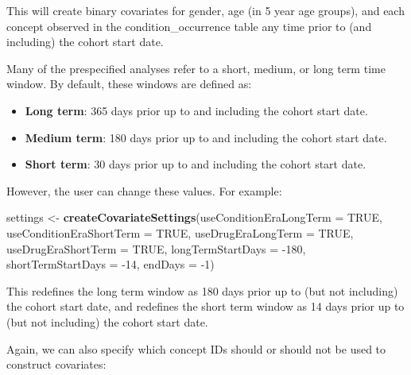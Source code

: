 \documentclass[11pt]{book}
\newenvironment{Shaded}{\begin{snugshade}}{\end{snugshade}}
\newcommand{\DataTypeTok}[1]{\textcolor[rgb]{0.13,0.29,0.53}{#1}}
\newcommand{\DecValTok}[1]{\textcolor[rgb]{0.00,0.00,0.81}{#1}}
\newcommand{\KeywordTok}[1]{\textcolor[rgb]{0.13,0.29,0.53}{\textbf{#1}}}
\newcommand{\NormalTok}[1]{#1}
\newcommand{\OtherTok}[1]{\textcolor[rgb]{0.56,0.35,0.01}{#1}}
\newcommand{\StringTok}[1]{\textcolor[rgb]{0.31,0.60,0.02}{#1}}
\providecommand{\tightlist}{%
  \setlength{\itemsep}{0pt}\setlength{\parskip}{0pt}}
\theoremstyle{definition}
\theoremstyle{definition}
\theoremstyle{definition}
\theoremstyle{remark}
\begin{document}
This will create binary covariates for gender, age (in 5 year age groups), and each concept observed in the condition\_occurrence table any time prior to (and including) the cohort start date.

Many of the prespecified analyses refer to a short, medium, or long term time window. By default, these windows are defined as:

\begin{itemize}
\tightlist
\item
  \textbf{Long term}: 365 days prior up to and including the cohort start date.
\item
  \textbf{Medium term}: 180 days prior up to and including the cohort start date.
\item
  \textbf{Short term}: 30 days prior up to and including the cohort start date.
\end{itemize}

However, the user can change these values. For example:

\begin{Shaded}
\begin{Highlighting}[]
\NormalTok{settings <-}\StringTok{ }\KeywordTok{createCovariateSettings}\NormalTok{(}\DataTypeTok{useConditionEraLongTerm =} \OtherTok{TRUE}\NormalTok{, }
                                    \DataTypeTok{useConditionEraShortTerm =} \OtherTok{TRUE}\NormalTok{, }
                                    \DataTypeTok{useDrugEraLongTerm =} \OtherTok{TRUE}\NormalTok{,}
                                    \DataTypeTok{useDrugEraShortTerm =} \OtherTok{TRUE}\NormalTok{, }
                                    \DataTypeTok{longTermStartDays =} \DecValTok{-180}\NormalTok{, }
                                    \DataTypeTok{shortTermStartDays =} \DecValTok{-14}\NormalTok{, }
                                    \DataTypeTok{endDays =} \DecValTok{-1}\NormalTok{) }
\end{Highlighting}
\end{Shaded}

This redefines the long term window as 180 days prior up to (but not including) the cohort start date, and redefines the short term window as 14 days prior up to (but not including) the cohort start date.

Again, we can also specify which concept IDs should or should not be used to construct covariates:
\end{document}
